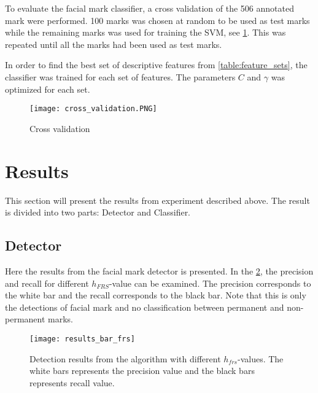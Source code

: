 To evaluate the facial mark classifier, a cross validation of the 506 annotated mark were performed. 100 marks was chosen at random to be used as test marks while the remaining marks was used for training the SVM, see \cref{fig:cross_validation}. This was repeated until all the marks had been used as test marks.

In order to find the best set of descriptive features from \cref{table:feature_sets}, the classifier was trained for each set of features. The parameters $C$ and $\gamma$ was optimized for each set.  

\FloatBarrier
\begin{figure}[!h]
	\centering
	\texttt{[image: cross\_validation.PNG]}
	\caption{Cross validation
		\label{fig:cross_validation}}
\end{figure} 
\FloatBarrier



\section{Results}

This section will present the results from experiment described above. The result is divided into two parts: Detector and Classifier. 

\subsection{Detector}

Here the results from the facial mark detector is presented. In the \cref{fig:results_bar_frs}, the precision and recall for different $h_{FRS}$-value can be examined. The precision corresponds to the white bar and the recall corresponds to the black bar. Note that this is only the detections of facial mark and no classification between permanent and non-permanent marks. 

\FloatBarrier
\begin{figure}[h!]
	\centering
	\texttt{[image: results\_bar\_frs]}
	\caption{Detection results from the algorithm with different $h_{frs}$-values. The white bars represents the precision value and the black bars represents recall value.  \label{fig:results_bar_frs}}
\end{figure}
\FloatBarrier

